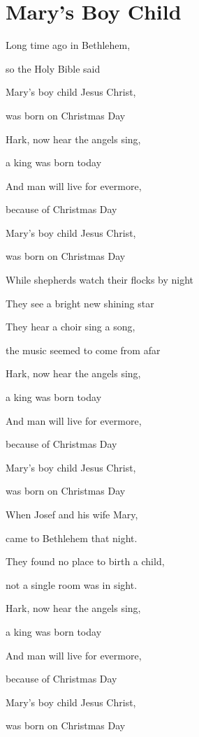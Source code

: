 \documentclass[11pt]{beamer}
\begin{document}
\section{Mary's Boy Child}
\begin{frame}
Long time ago in Bethlehem,

so the Holy Bible said

Mary's boy child Jesus Christ,

was born on Christmas Day
\end{frame}

\begin{frame}
Hark, now hear the angels sing,

a king was born today

And man will live for evermore,

because of Christmas Day

Mary's boy child Jesus Christ,

was born on Christmas Day
\end{frame}

\begin{frame}
While shepherds watch their flocks by night

They see a bright new shining star

They hear a choir sing a song,

the music seemed to come from afar
\end{frame}

\begin{frame}
Hark, now hear the angels sing,

a king was born today

And man will live for evermore,

because of Christmas Day

Mary's boy child Jesus Christ,

was born on Christmas Day
\end{frame}

\begin{frame}
When Josef and his wife Mary,

came to Bethlehem that night.

They found no place to birth a child,

not a single room was in sight.
\end{frame}

\begin{frame}
Hark, now hear the angels sing,

a king was born today

And man will live for evermore,

because of Christmas Day

Mary's boy child Jesus Christ,

was born on Christmas Day
\end{frame}
\end{document}
